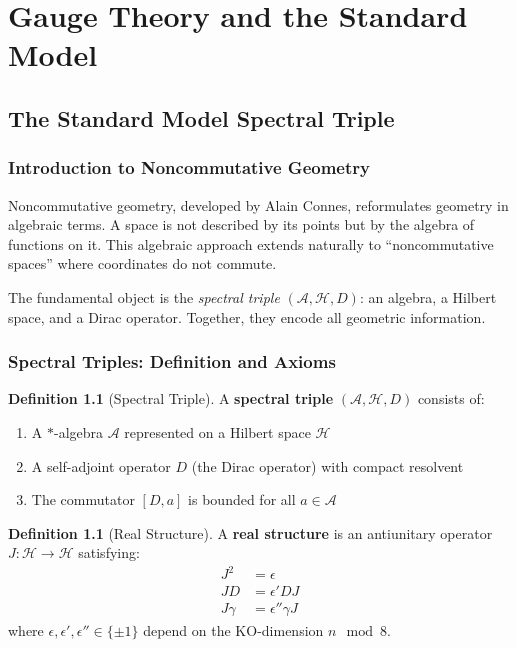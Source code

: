 \documentclass[11pt,a4paper,openright]{book}
\theoremstyle{plain}
\theoremstyle{definition}
\newtheorem{definition}[theorem]{Definition}
\newcommand{\Hil}{\mathcal{H}}
\newcommand{\A}{\mathcal{A}}
\begin{document}
\part{Gauge Theory and the Standard Model}

\chapter{The Standard Model Spectral Triple}
\label{ch:spectral-triple}

\section{Introduction to Noncommutative Geometry}

Noncommutative geometry, developed by Alain Connes, reformulates geometry in algebraic terms. A space is not described by its points but by the algebra of functions on it. This algebraic approach extends naturally to ``noncommutative spaces'' where coordinates do not commute.

The fundamental object is the \emph{spectral triple} $(\A, \Hil, D)$: an algebra, a Hilbert space, and a Dirac operator. Together, they encode all geometric information.

\section{Spectral Triples: Definition and Axioms}

\begin{definition}[Spectral Triple]
A \textbf{spectral triple} $(\A, \Hil, D)$ consists of:
\begin{enumerate}[label=(\roman*)]
    \item A $*$-algebra $\A$ represented on a Hilbert space $\Hil$
    \item A self-adjoint operator $D$ (the Dirac operator) with compact resolvent
    \item The commutator $[D, a]$ is bounded for all $a \in \A$
\end{enumerate}
\end{definition}

\begin{definition}[Real Structure]
A \textbf{real structure} is an antiunitary operator $J: \Hil \to \Hil$ satisfying:
\begin{align}
J^2 &= \epsilon \\
JD &= \epsilon' DJ \\
J\gamma &= \epsilon'' \gamma J
\end{align}
where $\epsilon, \epsilon', \epsilon'' \in \{\pm 1\}$ depend on the KO-dimension $n \mod 8$.
\end{definition}
\end{document}

